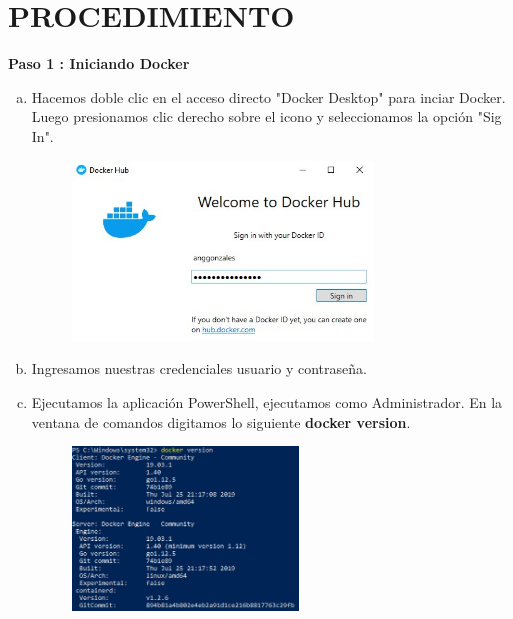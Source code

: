 \documentclass[preprint,12pt]{elsarticle}
\begin{document}
\section{PROCEDIMIENTO}
\textbf{Paso 1 : Iniciando Docker}
\begin{enumerate}[a)]
\item Hacemos doble clic en el acceso directo "Docker Desktop" para inciar Docker. Luego presionamos clic derecho sobre el icono y seleccionamos la opción "Sig In".
\begin{figure}[htb]
	\begin{center}
		\includegraphics[width=8cm]{./IMAGENES/Docker01}
	\end{center}
\end{figure}
\item Ingresamos nuestras credenciales usuario  y contraseña.
\item Ejecutamos la aplicación PowerShell, ejecutamos como Administrador. En la ventana de comandos digitamos lo siguiente \textbf{docker version}.
\begin{figure}[htb]
	\begin{center}
		\includegraphics[width=6cm]{./IMAGENES/Docker02}
	\end{center}
\end{figure}



\end{enumerate}
\end{document}
